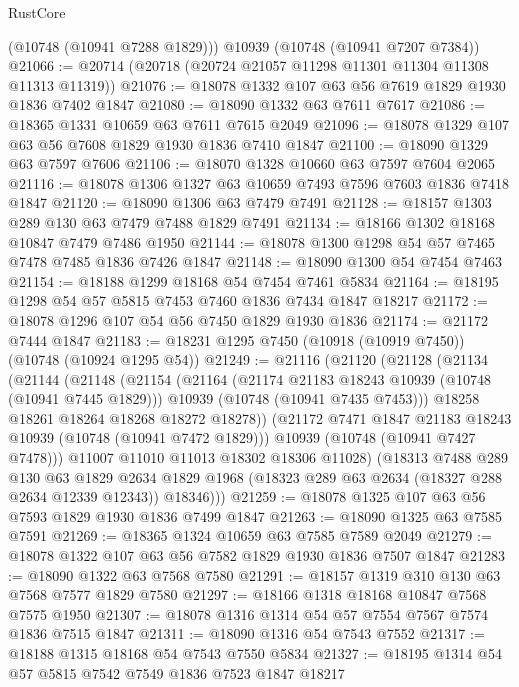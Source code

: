 \begin{lexlean}{RustCore}
\begin{coremodule}
      (@10748 (@10941 @7288 @1829)))
    @10939
    (@10748 (@10941 @7207 @7384))
@21066 := @20714 (@20718 (@20724 @21057 @11298 @11301 @11304 @11308 @11313 @11319))
@21076 := @18078 @1332 @107 @63 @56 @7619 @1829 @1930 @1836 @7402 @1847
@21080 := @18090 @1332 @63 @7611 @7617
@21086 := @18365 @1331 @10659 @63 @7611 @7615 @2049
@21096 := @18078 @1329 @107 @63 @56 @7608 @1829 @1930 @1836 @7410 @1847
@21100 := @18090 @1329 @63 @7597 @7606
@21106 := @18070 @1328 @10660 @63 @7597 @7604 @2065
@21116 := @18078 @1306 @1327 @63 @10659 @7493 @7596 @7603 @1836 @7418 @1847
@21120 := @18090 @1306 @63 @7479 @7491
@21128 := @18157 @1303 @289 @130 @63 @7479 @7488 @1829 @7491
@21134 := @18166 @1302 @18168 @10847 @7479 @7486 @1950
@21144 := @18078 @1300 @1298 @54 @57 @7465 @7478 @7485 @1836 @7426 @1847
@21148 := @18090 @1300 @54 @7454 @7463
@21154 := @18188 @1299 @18168 @54 @7454 @7461 @5834
@21164 := @18195 @1298 @54 @57 @5815 @7453 @7460 @1836 @7434 @1847 @18217
@21172 := @18078 @1296 @107 @54 @56 @7450 @1829 @1930 @1836
@21174 := @21172 @7444 @1847
@21183 := @18231 @1295 @7450 (@10918 (@10919 @7450)) (@10748 (@10924 @1295 @54))
@21249 := @21116
    (@21120
      (@21128
        (@21134
          (@21144
            (@21148
              (@21154
                (@21164
                  (@21174 @21183 @18243 @10939 (@10748 (@10941 @7445 @1829)))
                  @10939
                  (@10748 (@10941 @7435 @7453)))
                @18258
                @18261
                @18264
                @18268
                @18272
                @18278))
            (@21172 @7471 @1847 @21183 @18243 @10939 (@10748 (@10941 @7472 @1829)))
            @10939
            (@10748 (@10941 @7427 @7478)))
          @11007
          @11010
          @11013
          @18302
          @18306
          @11028)
        (@18313
          @7488
          @289
          @130
          @63
          @1829
          @2634
          @1829
          @1968
          (@18323 @289 @63 @2634 (@18327 @288 @2634 @12339 @12343))
          @18346)))
@21259 := @18078 @1325 @107 @63 @56 @7593 @1829 @1930 @1836 @7499 @1847
@21263 := @18090 @1325 @63 @7585 @7591
@21269 := @18365 @1324 @10659 @63 @7585 @7589 @2049
@21279 := @18078 @1322 @107 @63 @56 @7582 @1829 @1930 @1836 @7507 @1847
@21283 := @18090 @1322 @63 @7568 @7580
@21291 := @18157 @1319 @310 @130 @63 @7568 @7577 @1829 @7580
@21297 := @18166 @1318 @18168 @10847 @7568 @7575 @1950
@21307 := @18078 @1316 @1314 @54 @57 @7554 @7567 @7574 @1836 @7515 @1847
@21311 := @18090 @1316 @54 @7543 @7552
@21317 := @18188 @1315 @18168 @54 @7543 @7550 @5834
@21327 := @18195 @1314 @54 @57 @5815 @7542 @7549 @1836 @7523 @1847 @18217

\end{coremodule}
\end{lexlean}
